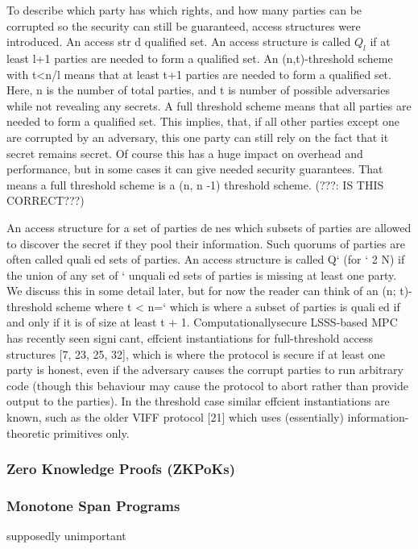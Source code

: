 \documentclass[english,runningheads,a4paper]{llncs}[2018/03/10]
\begin{document}
To describe which party has which rights, and how many parties can be corrupted so the security can still be guaranteed, access structures were introduced.
An access str 
d qualified set.  An access structure is called \(Q_l \) if at least l+1 parties are needed to  form a qualified set. 
An (n,t)-threshold scheme with t<n/l means that at least t+1 parties are needed to form a qualified set. Here, n is the number of total parties, and t is number of possible adversaries while not revealing any secrets.
A full threshold scheme means that all parties are needed to form a qualified set. This implies, that, if all other parties except one are corrupted by an adversary, this one party can still rely on the fact that it secret remains secret. Of course this has a huge impact on overhead and performance, but in some cases it can give needed security guarantees. That means a full threshold scheme is a (n, n -1) threshold scheme. (???: IS THIS CORRECT???)


An access structure for a set of parties denes which subsets of parties are
allowed to discover the secret if they pool their information. Such quorums of
parties are often called qualied sets of parties. An access structure is called Q`
(for ` 2 N) if the union of any set of ` unqualied sets of parties is missing at
least one party. We discuss this in some detail later, but for now the reader can
think of an (n; t)-threshold scheme where t < n=` which is where a subset of
parties is qualied if and only if it is of size at least t + 1. Computationallysecure
LSSS-based MPC has recently seen signicant, effcient instantiations
for full-threshold access structures [7, 23, 25, 32], which is where the protocol is
secure if at least one party is honest, even if the adversary causes the corrupt
parties to run arbitrary code (though this behaviour may cause the protocol to
abort rather than provide output to the parties). In the threshold case similar
effcient instantiations are known, such as the older VIFF protocol [21] which
uses (essentially) information-theoretic primitives only.

\subsubsection{Zero Knowledge Proofs (ZKPoKs)}


\subsubsection{Monotone Span Programs}
supposedly unimportant
\end{document}
